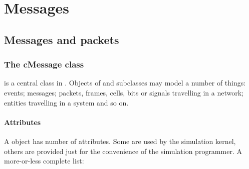 \chapter{Messages}
\label{cha:messages}

\section{Messages and packets}

\subsection{The cMessage class}

 is a central class in {\opp}. Objects of  and
subclasses may model a number of things: events;
messages; packets, frames, cells, bits or signals travelling
in a network; entities travelling in a system and so on.

%
%

\subsubsection{Attributes}


A  object has number of attributes. Some are used by
the simulation kernel, others are provided just for the convenience
of the simulation programmer. A more-or-less complete list:

